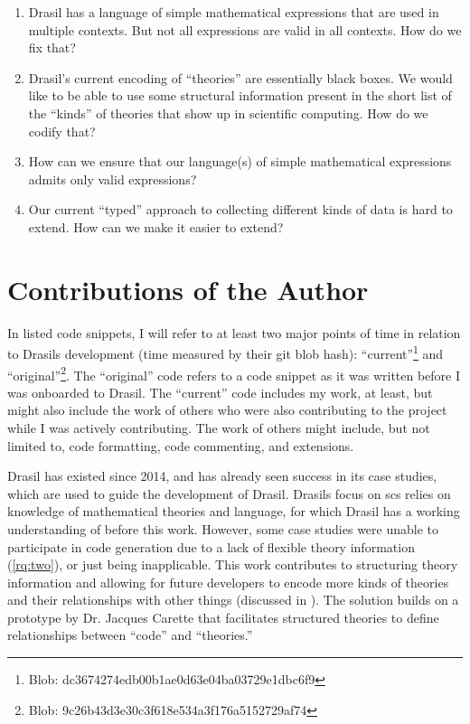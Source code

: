 \begin{enumerate}

      \item[\namedlabel{rq:one}{RQ1}] Drasil has a language of simple
            mathematical expressions that are used in multiple contexts. But not
            all expressions are valid in all contexts. How do we fix that?

      \item[\namedlabel{rq:two}{RQ2}] Drasil's current encoding of ``theories''
            are essentially black boxes. We would like to be able to use some
            structural information present in the short list of the ``kinds'' of
            theories that show up in scientific computing. How do we codify
            that?

      \item[\namedlabel{rq:three}{RQ3}] How can we ensure that our language(s)
            of simple mathematical expressions admits only valid expressions?

      \item[\namedlabel{rq:four}{RQ4}] Our current ``typed'' approach to
            collecting different kinds of data is hard to extend. How can we
            make it easier to extend?

\end{enumerate}

\section{Contributions of the Author}
\label{sec:intro:contributions}

In listed code snippets, I will refer to at least two major points of time in
relation to Drasils development (time measured by their git blob hash):
``current''\footnote{Blob: dc3674274edb00b1ae0d63e04ba03729e1dbc6f9} and
``original''\footnote{Blob: 9c26b43d3e30c3f618e534a3f176a5152729af74}. The
``original'' code refers to a code snippet as it was written before I was
onboarded to Drasil. The ``current'' code includes my work, at least, but might
also include the work of others who were also contributing to the project while
I was actively contributing. The work of others might include, but not limited
to, code formatting, code commenting, and extensions. 

Drasil has existed since 2014, and has already seen success in its case studies,
which are used to guide the development of Drasil. Drasils focus on \acs{scs}
relies on knowledge of mathematical theories and language, for which Drasil has
a working understanding of before this work. However, some case studies were
unable to participate in code generation due to a lack of flexible theory
information (\ref{rq:two}), or just being inapplicable. This work contributes to
structuring theory information and allowing for future developers to encode more
kinds of theories and their relationships with other things (discussed in
). The solution builds on a prototype by Dr. Jacques
Carette that facilitates
structured theories to define relationships between ``code'' and ``theories.''

